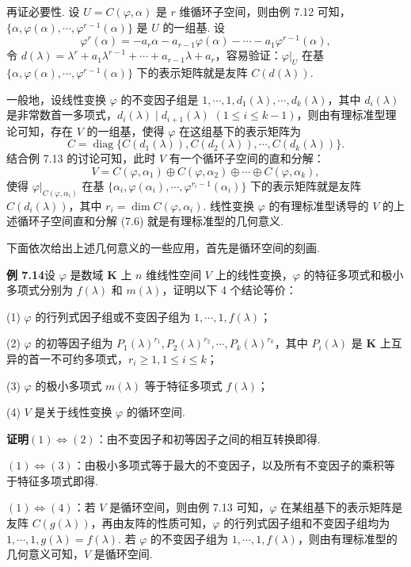\documentclass[UTF8, 12pt, fontset=fandol, oneside]{ctexart}
\begin{document}
再证必要性. 设 $U=C(\varphi,\alpha)$ 是 $r$ 维循环子空间，则由例 7.12 可知，$\{\alpha,\varphi(\alpha),\cdots,\varphi^{r-1}(\alpha)\}$ 是 $U$ 的一组基. 设
\[
\varphi^r(\alpha)=-a_r\alpha-a_{r-1}\varphi(\alpha)-\cdots-a_1\varphi^{r-1}(\alpha),
\]
令 $d(\lambda)=\lambda^r+a_1\lambda^{r-1}+\cdots+a_{r-1}\lambda+a_r$，容易验证：$\varphi|_U$ 在基 $\{\alpha,\varphi(\alpha),\cdots,\varphi^{r-1}(\alpha)\}$ 下的表示矩阵就是友阵 $C(d(\lambda))$.

一般地，设线性变换 $\varphi$ 的不变因子组是 $1,\cdots,1,d_1(\lambda),\cdots,d_k(\lambda)$，其中 $d_i(\lambda)$ 是非常数首一多项式，$d_i(\lambda)\mid d_{i+1}(\lambda)$ $(1\le i\le k-1)$，则由有理标准型理论可知，存在 $V$ 的一组基，使得 $\varphi$ 在这组基下的表示矩阵为
\[
C=\operatorname{diag}\{C(d_1(\lambda)),C(d_2(\lambda)),\cdots,C(d_k(\lambda))\}.
\]
结合例 7.13 的讨论可知，此时 $V$ 有一个循环子空间的直和分解：
\begin{equation}
V=C(\varphi,\alpha_1)\oplus C(\varphi,\alpha_2)\oplus\cdots\oplus C(\varphi,\alpha_k),
\tag{7.6}
\end{equation}
使得 $\varphi|_{C(\varphi,\alpha_i)}$ 在基 $\{\alpha_i,\varphi(\alpha_i),\cdots,\varphi^{r_i-1}(\alpha_i)\}$ 下的表示矩阵就是友阵 $C(d_i(\lambda))$，其中 $r_i=\dim C(\varphi,\alpha_i)$. 线性变换 $\varphi$ 的有理标准型诱导的 $V$ 的上述循环子空间直和分解 (7.6) 就是有理标准型的几何意义.

下面依次给出上述几何意义的一些应用，首先是循环空间的刻画.

\noindent\textbf{例 7.14}\quad 设 $\varphi$ 是数域 $\mathbf{K}$ 上 $n$ 维线性空间 $V$ 上的线性变换，$\varphi$ 的特征多项式和极小多项式分别为 $f(\lambda)$ 和 $m(\lambda)$，证明以下 4 个结论等价：

(1) $\varphi$ 的行列式因子组或不变因子组为 $1,\cdots,1,f(\lambda)$；

(2) $\varphi$ 的初等因子组为 $P_1(\lambda)^{r_1},P_2(\lambda)^{r_2},\cdots,P_k(\lambda)^{r_k}$，其中 $P_i(\lambda)$ 是 $\mathbf{K}$ 上互异的首一不可约多项式，$r_i\ge 1,1\le i\le k$；

(3) $\varphi$ 的极小多项式 $m(\lambda)$ 等于特征多项式 $f(\lambda)$；

(4) $V$ 是关于线性变换 $\varphi$ 的循环空间.

\noindent\textbf{证明}\quad $(1)\Leftrightarrow(2)$：由不变因子和初等因子之间的相互转换即得.

$(1)\Leftrightarrow(3)$：由极小多项式等于最大的不变因子，以及所有不变因子的乘积等于特征多项式即得.

$(1)\Leftrightarrow(4)$：若 $V$ 是循环空间，则由例 7.13 可知，$\varphi$ 在某组基下的表示矩阵是友阵 $C(g(\lambda))$，再由友阵的性质可知，$\varphi$ 的行列式因子组和不变因子组均为 $1,\cdots,1,g(\lambda)=f(\lambda)$. 若 $\varphi$ 的不变因子组为 $1,\cdots,1,f(\lambda)$，则由有理标准型的几何意义可知，$V$ 是循环空间.
\end{document}
